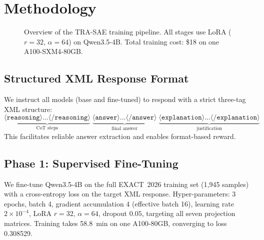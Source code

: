 \documentclass{ieeeaccess}
\newcommand{\modelname}{\textsc{TRA-SAE}}
\newcommand{\basemodelname}{Qwen3.5-4B}
\newcommand{\dataset}{EXACT~2026}
\begin{document}
\section{Methodology}
\label{sec:method}

\begin{figure}[t]
  \centering
  \caption{Overview of the \modelname{} training pipeline. All stages
           use LoRA ($r{=}32$, $\alpha{=}64$) on \basemodelname{}.
           Total training cost: \$18 on one A100-SXM4-80GB.}
  \label{fig:pipeline}
\end{figure}

\subsection{Structured XML Response Format}

We instruct all models (base and fine-tuned) to respond with a strict
three-tag XML structure:
\begin{equation}
  \underbrace{\langle\texttt{reasoning}\rangle\ldots\langle/\texttt{reasoning}\rangle}_{\text{CoT steps}}
  \;
  \underbrace{\langle\texttt{answer}\rangle\ldots\langle/\texttt{answer}\rangle}_{\text{final answer}}
  \;
  \underbrace{\langle\texttt{explanation}\rangle\ldots\langle/\texttt{explanation}\rangle}_{\text{justification}}
\end{equation}
This facilitates reliable answer extraction and enables format-based reward.

\subsection{Phase 1: Supervised Fine-Tuning}

We fine-tune \basemodelname{} on the full \dataset{} training set
(1,945 samples) with a cross-entropy loss on the target XML response.
Hyper-parameters: 3 epochs, batch 4, gradient accumulation 4 (effective
batch 16), learning rate $2 \times 10^{-4}$, LoRA $r=32$,
$\alpha=64$, dropout $0.05$, targeting all seven projection matrices.
Training takes 58.8~min on one A100-80GB, converging to
loss 0.308529.
\end{document}
